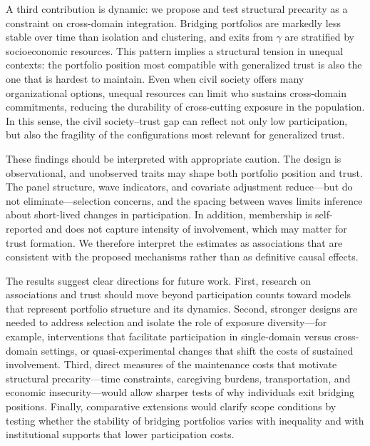 A third contribution is dynamic: we propose and test structural precarity as a constraint on cross-domain integration. Bridging portfolios are markedly less stable over time than isolation and clustering, and exits from $\gamma$ are stratified by socioeconomic resources. This pattern implies a structural tension in unequal contexts: the portfolio position most compatible with generalized trust is also the one that is hardest to maintain. Even when civil society offers many organizational options, unequal resources can limit who sustains cross-domain commitments, reducing the durability of cross-cutting exposure in the population. In this sense, the civil society–trust gap can reflect not only low participation, but also the fragility of the configurations most relevant for generalized trust.

These findings should be interpreted with appropriate caution. The design is observational, and unobserved traits may shape both portfolio position and trust. The panel structure, wave indicators, and covariate adjustment reduce—but do not eliminate—selection concerns, and the spacing between waves limits inference about short-lived changes in participation. In addition, membership is self-reported and does not capture intensity of involvement, which may matter for trust formation. We therefore interpret the estimates as associations that are consistent with the proposed mechanisms rather than as definitive causal effects.

The results suggest clear directions for future work. First, research on associations and trust should move beyond participation counts toward models that represent portfolio structure and its dynamics. Second, stronger designs are needed to address selection and isolate the role of exposure diversity—for example, interventions that facilitate participation in single-domain versus cross-domain settings, or quasi-experimental changes that shift the costs of sustained involvement. Third, direct measures of the maintenance costs that motivate structural precarity—time constraints, caregiving burdens, transportation, and economic insecurity—would allow sharper tests of why individuals exit bridging positions. Finally, comparative extensions would clarify scope conditions by testing whether the stability of bridging portfolios varies with inequality and with institutional supports that lower participation costs.

